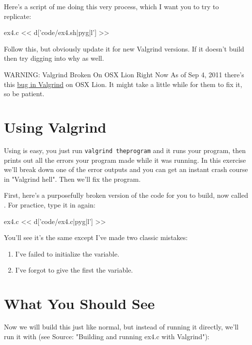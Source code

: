 Here's a script of me doing this very process, which I want you to
try to replicate:

\begin{code}{ex4.c}
<< d['code/ex4.sh|pyg|l'] >>
\end{code}

Follow this, but obviously update it for new Valgrind versions.  If it
doesn't build then try digging into why as well.

\begin{aside}{WARNING: Valgrind Broken On OSX Lion Right Now}
As of Sep 4, 2011 there's this \href{http://bit.ly/qRxc6s}{bug in Valgrind}
on OSX Lion.  It might take a little while for them to fix it, so be patient.
\end{aside}


\section{Using Valgrind}

Using  is easy, you just run \verb|valgrind theprogram| and
it runs your program, then prints out all the errors your program made while it
was running.  In this exercise we'll break down one of the error outputs and
you can get an instant crash course in "Valgrind hell".  Then we'll fix the
program.

First, here's a purposefully broken version of the  code
for you to build, now called .  For practice, type it
in again:

\begin{code}{ex4.c}
<< d['code/ex4.c|pyg|l'] >>
\end{code}

You'll see it's the same except I've made two classic mistakes:

\begin{enumerate}
\item I've failed to initialize the  variable.
\item I've forgot to give the first  the  variable.
\end{enumerate}

\section{What You Should See}

Now we will build this just like normal, but instead of running it
directly, we'll run it with  (see Source: "Building and running ex4.c with Valgrind"):

